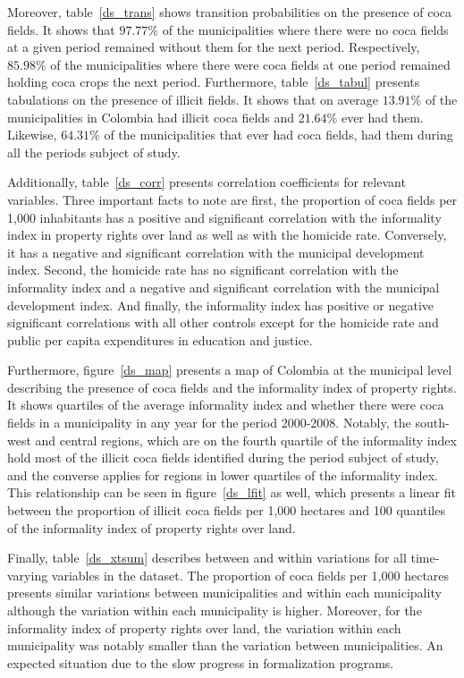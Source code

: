 \documentclass[12pt,a4paper,english]{article}%
\begin{document}
Moreover, table~\ref{ds_trans} shows transition probabilities on the presence of coca fields. It shows that $97.77\%$ of the municipalities where there were no coca fields at a given period remained without them for the next period. Respectively, $85.98\%$ of the municipalities where there were coca fields at one period remained holding coca crops the next period. Furthermore, table~\ref{ds_tabul} presents tabulations on the presence of illicit  fields. It shows that on average $13.91\%$ of the municipalities in Colombia had illicit coca fields and $21.64\%$ ever had them. Likewise, $64.31\%$ of the municipalities that ever had coca fields, had them during all the periods subject of study.

Additionally, table~\ref{ds_corr} presents correlation coefficients for relevant variables. Three important facts to note are first, the proportion of coca fields per 1,000 inhabitants has a positive and significant correlation with the informality index in property rights over land as well as with the homicide rate. Conversely, it has a negative and significant correlation with the municipal development index. Second, the homicide rate has no significant correlation with the informality index and a negative and significant correlation with the municipal development index. And finally, the informality index has positive or negative significant correlations with all other controls except for the homicide rate and public per capita expenditures in education and justice.

Furthermore, figure~\ref{ds_map} presents a map of Colombia at the municipal level describing the presence of coca fields and the informality index of property rights. It shows quartiles of the average informality index and whether there were coca fields in a municipality in any year for the period 2000-2008. Notably, the south-west and central regions, which are on the fourth quartile of the informality index hold most of the illicit coca fields identified during the period subject of study, and the converse applies for regions in lower quartiles of the informality index. This relationship can be seen in figure~\ref{ds_lfit} as well, which presents a linear fit between the proportion of illicit coca fields per 1,000 hectares and 100 quantiles of the informality index of property rights over land. 

Finally, table~\ref{ds_xtsum} describes between and within variations for all time-varying variables in the dataset. The proportion of coca fields per 1,000 hectares presents similar variations between municipalities and within each municipality although the variation within each municipality is higher. Moreover, for the informality index of property rights over land, the variation within each municipality was notably smaller than the variation between municipalities. An expected situation due to the slow progress in formalization programs.
\end{document}
